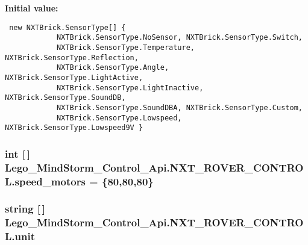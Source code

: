 \textbf{Initial value:}

\begin{Code}\begin{verbatim} new NXTBrick.SensorType[] {
            NXTBrick.SensorType.NoSensor, NXTBrick.SensorType.Switch,
            NXTBrick.SensorType.Temperature, NXTBrick.SensorType.Reflection,
            NXTBrick.SensorType.Angle, NXTBrick.SensorType.LightActive,
            NXTBrick.SensorType.LightInactive, NXTBrick.SensorType.SoundDB,
            NXTBrick.SensorType.SoundDBA, NXTBrick.SensorType.Custom,
            NXTBrick.SensorType.Lowspeed, NXTBrick.SensorType.Lowspeed9V }
\end{verbatim}
\end{Code}
\hypertarget{class_lego___mind_storm___control___api_1_1_n_x_t___r_o_v_e_r___c_o_n_t_r_o_l_c3a7b949d40838384197e2a9c431238d}{
\subsubsection[{speed\_\-motors}]{\setlength{\rightskip}{0pt plus 5cm}int \mbox{[}$\,$\mbox{]} {\bf Lego\_\-MindStorm\_\-Control\_\-Api.NXT\_\-ROVER\_\-CONTROL.speed\_\-motors} = \{80,80,80\}}}
\label{class_lego___mind_storm___control___api_1_1_n_x_t___r_o_v_e_r___c_o_n_t_r_o_l_c3a7b949d40838384197e2a9c431238d}


\hypertarget{class_lego___mind_storm___control___api_1_1_n_x_t___r_o_v_e_r___c_o_n_t_r_o_l_e4796f566a10c7f4906273166e3f17ab}{
\subsubsection[{unit}]{\setlength{\rightskip}{0pt plus 5cm}string \mbox{[}$\,$\mbox{]} {\bf Lego\_\-MindStorm\_\-Control\_\-Api.NXT\_\-ROVER\_\-CONTROL.unit}}}
\label{class_lego___mind_storm___control___api_1_1_n_x_t___r_o_v_e_r___c_o_n_t_r_o_l_e4796f566a10c7f4906273166e3f17ab}


